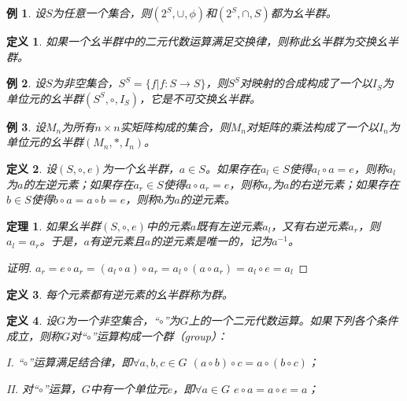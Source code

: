 \documentclass{article}
\newtheorem{Def}{定义}
\newtheorem{Thm}{定理}
\newtheorem*{Example}{例}
\begin{document}
\begin{CJK*}{UTF8}{gbsn}
  \begin{Example}
    设$S$为任意一个集合，则$(2^S,\cup,\phi)$和$(2^S,\cap,S)$都为幺半群。
  \end{Example}
  
  \begin{Def}
    如果一个幺半群中的二元代数运算满足交换律，则称此幺半群为交换幺半群。
  \end{Def}
  
  \begin{Example}
    设$S$为非空集合，$S^S=\{f|f:S\to S\}$，则$S^S$对映射的合成构成了一个以$I_S$为单位元的幺半群$(S^S,\circ,I_S)$，它是不可交换幺半群。
  \end{Example}
  \begin{Example}
    设$M_n$为所有$n\times n$实矩阵构成的集合，则$M_n$对矩阵的乘法构成了一个以$I_n$为单位元的幺半群$(M_n,*,I_n)$。
  \end{Example}
  
  
  \begin{Def}
    设$(S,\circ,e)$为一个幺半群，$a\in S$。如果存在$a_l\in S$使得$a_l\circ a=e$，则称$a_l$为$a$的左逆元素；如果存在$a_r
    \in S$使得$a\circ a_r=e$，则称$a_r$为$a$的右逆元素；如果存在$b\in S$使得$b\circ a=a\circ b=e$，则称$b$为$a$的逆元素。
  \end{Def}
  \begin{Thm}
    如果幺半群$(S,\circ,e)$中的元素$a$既有左逆元素$a_l$，又有右逆元素$a_r$，则$a_l=a_r$。于是，$a$有逆元素且$a$的逆元素是唯一的，记为$a^{-1}$。
  \end{Thm}
  \begin{proof}[证明]
    $a_r=e\circ a_r=(a_l\circ a)\circ a_r=a_l\circ(a\circ a_r)=a_l\circ e=a_l$
  \end{proof}
  \begin{Def}
    每个元素都有逆元素的幺半群称为群。
  \end{Def}
  
  \begin{Def}
    设$G$为一个非空集合，“$\circ$”为$G$上的一个二元代数运算。如果下列各个条件成立，则称$G$对“$\circ$”运算构成一个群（group）：
  
    I. “$\circ$”运算满足结合律，即$\forall a,b,c \in G$ $(a\circ b)\circ c = a\circ(b\circ c)$；
  
    II. 对“$\circ$”运算，$G$中有一个单位元$e$，即$\forall a\in G$ $e\circ a =a\circ e= a$；
  

\end{Def}
\end{CJK*}
\end{document}
